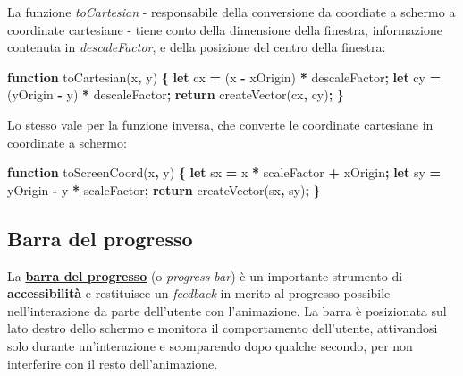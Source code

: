 \documentclass[
]{book}
\newenvironment{Shaded}{\begin{snugshade}}{\end{snugshade}}
\newcommand{\AttributeTok}[1]{\textcolor[rgb]{0.77,0.63,0.00}{#1}}
\newcommand{\ControlFlowTok}[1]{\textcolor[rgb]{0.13,0.29,0.53}{\textbf{#1}}}
\newcommand{\KeywordTok}[1]{\textcolor[rgb]{0.13,0.29,0.53}{\textbf{#1}}}
\newcommand{\NormalTok}[1]{#1}
\newcommand{\OperatorTok}[1]{\textcolor[rgb]{0.81,0.36,0.00}{\textbf{#1}}}
\begin{document}
La funzione \emph{toCartesian} - responsabile della conversione da coordiate a schermo a coordinate cartesiane - tiene conto della dimensione della finestra, informazione contenuta in \emph{descaleFactor}, e della posizione del centro della finestra:

\begin{Shaded}
\begin{Highlighting}[]
\KeywordTok{function} \AttributeTok{toCartesian}\NormalTok{(x}\OperatorTok{,}\NormalTok{ y) }\OperatorTok{\{}
  \KeywordTok{let}\NormalTok{ cx }\OperatorTok{=}\NormalTok{ (x }\OperatorTok{-}\NormalTok{ xOrigin) }\OperatorTok{*}\NormalTok{ descaleFactor}\OperatorTok{;}
  \KeywordTok{let}\NormalTok{ cy }\OperatorTok{=}\NormalTok{ (yOrigin }\OperatorTok{-}\NormalTok{ y) }\OperatorTok{*}\NormalTok{ descaleFactor}\OperatorTok{;}
  \ControlFlowTok{return} \AttributeTok{createVector}\NormalTok{(cx}\OperatorTok{,}\NormalTok{ cy)}\OperatorTok{;}
\OperatorTok{\}}
\end{Highlighting}
\end{Shaded}

Lo stesso vale per la funzione inversa, che converte le coordinate cartesiane in coordinate a schermo:

\begin{Shaded}
\begin{Highlighting}[]
\KeywordTok{function} \AttributeTok{toScreenCoord}\NormalTok{(x}\OperatorTok{,}\NormalTok{ y) }\OperatorTok{\{}
  \KeywordTok{let}\NormalTok{ sx }\OperatorTok{=}\NormalTok{ x }\OperatorTok{*}\NormalTok{ scaleFactor }\OperatorTok{+}\NormalTok{ xOrigin}\OperatorTok{;}
  \KeywordTok{let}\NormalTok{ sy }\OperatorTok{=}\NormalTok{ yOrigin }\OperatorTok{-}\NormalTok{ y }\OperatorTok{*}\NormalTok{ scaleFactor}\OperatorTok{;}
  \ControlFlowTok{return} \AttributeTok{createVector}\NormalTok{(sx}\OperatorTok{,}\NormalTok{ sy)}\OperatorTok{;}
\OperatorTok{\}}
\end{Highlighting}
\end{Shaded}

\hypertarget{progrbar}{%
\subsection{Barra del progresso}\label{progrbar}}

La \href{https://github.com/Bradwave/thesis/blob/master/animations/js/utils/progressGraphics.js}{\textbf{barra del progresso}} (o \emph{progress bar}) è un importante strumento di \textbf{accessibilità} e restituisce un \emph{feedback} in merito al progresso possibile nell'interazione da parte dell'utente con l'animazione. La barra è posizionata sul lato destro dello schermo e monitora il comportamento dell'utente, attivandosi solo durante un'interazione e scomparendo dopo qualche secondo, per non interferire con il resto dell'animazione.
\end{document}
